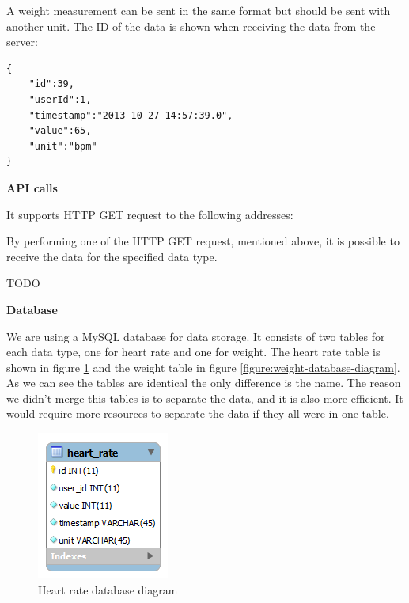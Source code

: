 A weight measurement can be sent in the same format but should be sent with another unit.
The ID of the data is shown when receiving the data from the server:

\begin{verbatim}
{
    "id":39,
    "userId":1,
    "timestamp":"2013-10-27 14:57:39.0",
    "value":65,
    "unit":"bpm"
}
\end{verbatim} 

\textbf{API calls}

It supports HTTP GET request to the following addresses:


By performing one of the HTTP GET request, mentioned above, it is possible to receive the data for the specified data type.

TODO

\textbf{Database}

We are using a MySQL database for data storage.
It consists of two tables for each data type, one for heart rate and one for weight.
The heart rate table is shown in figure \ref{figure:heart-rate-database-diagram} and the weight table in figure \ref{figure:weight-database-diagram}. 
As we can see the tables are identical the only difference is the name.
The reason we didn't merge this tables is to separate the data, and it is also more efficient.
It would require more resources to separate the data if they all were in one table.

\begin{figure}[h]
\centering
\includegraphics[scale=1.0]{../Figures/heart-rate-database-diagram.png}
\caption{Heart rate database diagram}
\label{figure:heart-rate-database-diagram}
\end{figure}

